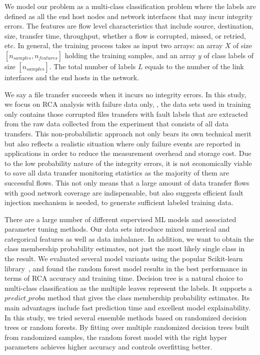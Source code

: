 We model our problem as a multi-class classification problem where the labels are defined as all the end host nodes and network interfaces that may incur integrity errors. 
The features are flow level characteristics that include source, destination, size, transfer time, throughput, whether a flow is corrupted, missed, or retried, etc. In general, the training process takes 
as input two arrays: an array $X$ of size $[n_{samples}, n_{features}]$ holding the training samples, and an array $y$ of class labels of size $[n_{samples}]$. 
The total number of labels $L$ equals to the number of the link interfaces and the end hosts in the network. 

We say a file transfer succeeds when it incurs no integrity errors. In this study, we focus on RCA analysis with failure data only, \ie, the data sets used in training only contains those corrupted files transfers with fault labels that are extracted from the raw data collected from the experiment that consists of all data transfers. This non-probabilistic approach not only bears its own technical merit but also reflects a realistic situation where only failure events are reported in applications in order to reduce the measurement overhead and storage cost. Due to the low probability nature of the integrity errors, it is not economically viable to save all data transfer monitoring statistics as the majority of them are successful flows. This not only means that a large amount of data transfer flows with good network coverage are indispensable, but also suggests efficient fault injection mechanism is needed, to generate sufficient labeled training data.

There are a large number of different supervised ML models and associated parameter tuning methods. Our data sets introduce mixed numerical and categorical features as well as data imbalance. 
In addition, we want to obtain the class membership probability estimates, not just the most likely single class in the result. We evaluated several model variants using the popular Scikit-learn library~\cite{Scikit:web},  
and found the random forest model results in the best performance in terms of RCA accuracy and training time. 
Decision tree is a natural choice to multi-class classification as the multiple leaves represent the labels. It supports a $predict\_proba$ method that gives the class membership probability estimates. 
Its main advantages include fast prediction time and excellent model explainability. In this study, we tried several ensemble methods based on randomized decision trees or random forests. 
By fitting over multiple randomized decision trees built from randomized samples, the random forest model with the right hyper parameters achieves higher accuracy and controls overfitting better. 

